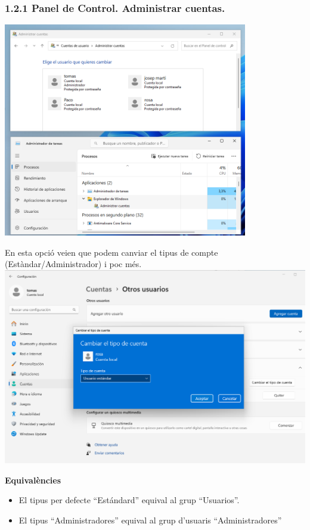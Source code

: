 \documentclass[
  a4paper,
]{article}
\providecommand{\tightlist}{%
  \setlength{\itemsep}{0pt}\setlength{\parskip}{0pt}}
\begin{document}
\subsubsection{1.2.1 Panel de Control. Administrar
cuentas.}\label{panel-de-control.-administrar-cuentas.}

\includegraphics[width=0.8\textwidth,height=\textheight]{png/1PaneldeControlAdministrarCuentas.png}

En esta opció veien que podem canviar el tipus de compte
(Estàndar/Administrador) i poc més.
\includegraphics{png/cambiaTipoCuenta.png}

\textbf{Equivalències}

\begin{itemize}
\tightlist
\item
  El tipus per defecte ``Estándard'' equival al grup ``Usuarios''.
\item
  El tipus ``Administradores'' equival al grup d'usuaris
  ``Administradores''
\end{itemize}
\end{document}
